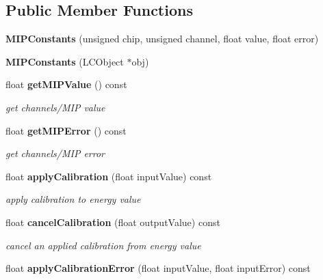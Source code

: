 \subsection*{Public Member Functions}
\begin{DoxyCompactItemize}
\item 
{\bfseries MIPConstants} (unsigned chip, unsigned channel, float value, float error)\label{classCALICE_1_1MIPConstants_a00df4532d023e4daad39bcc0ee5538f4}

\item 
{\bfseries MIPConstants} (LCObject $\ast$obj)\label{classCALICE_1_1MIPConstants_aec5ab4aecbf0d776c678ec1faee7eb6c}

\item 
float {\bf getMIPValue} () const \label{classCALICE_1_1MIPConstants_a81e18faa3e81f04034e750b2db519521}

\begin{DoxyCompactList}\small\item\em get channels/MIP value \item\end{DoxyCompactList}\item 
float {\bf getMIPError} () const \label{classCALICE_1_1MIPConstants_a518c72090d9dd86b3c14d94c62967d13}

\begin{DoxyCompactList}\small\item\em get channels/MIP error \item\end{DoxyCompactList}\item 
float {\bf applyCalibration} (float inputValue) const \label{classCALICE_1_1MIPConstants_a1ce8759ffdc72c9975ef2705c08fc4d7}

\begin{DoxyCompactList}\small\item\em apply calibration to energy value \item\end{DoxyCompactList}\item 
float {\bf cancelCalibration} (float outputValue) const \label{classCALICE_1_1MIPConstants_a601776b7a8e8558d4b54a00ecc981f0f}

\begin{DoxyCompactList}\small\item\em cancel an applied calibration from energy value \item\end{DoxyCompactList}\item 
float {\bf applyCalibrationError} (float inputValue, float inputError) const \label{classCALICE_1_1MIPConstants_a7beb08be64e40e822288cf285b5601e0}


\end{DoxyCompactItemize}
